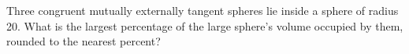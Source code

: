 Three congruent mutually externally tangent spheres lie inside a sphere of radius 20. What is the largest percentage of the large sphere's volume occupied by them, rounded to the nearest percent?
